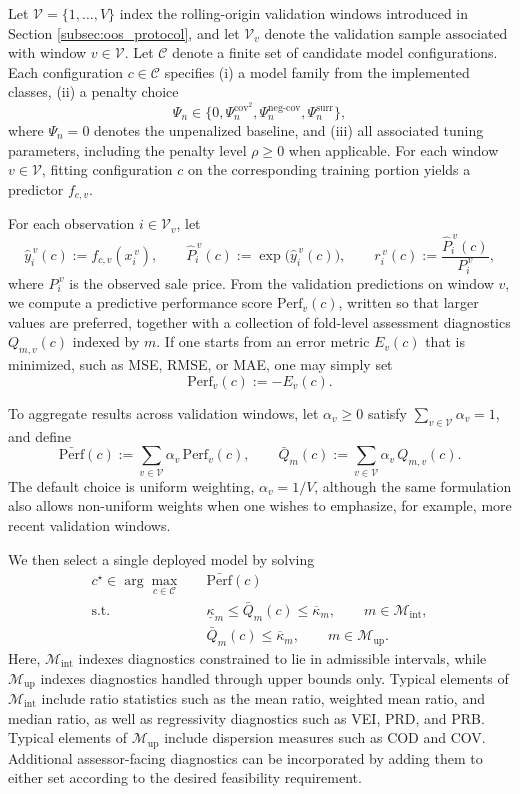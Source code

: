 \documentclass[12pt, draft]{article}
\theoremstyle{plain}
\theoremstyle{definition}
\newcommand{\1}{\mathbf{1}}
\begin{document}
{Let $\mathcal V=\{1,\dots,V\}$ index the rolling-origin validation windows introduced in Section \ref{subsec:oos_protocol}, and let $\mathcal V_v$ denote the validation sample associated with window $v\in\mathcal V$. Let $\mathcal C$ denote a finite set of candidate model configurations. Each configuration $c\in\mathcal C$ specifies
(i) a model family from the implemented classes,
(ii) a penalty choice
\[
\Psi_n \in \{0,\Psi_n^{\mathrm{cov}^2},\Psi_n^{\mathrm{neg\mbox{-}cov}},\Psi_n^{\mathrm{surr}}\},
\]
where $\Psi_n=0$ denotes the unpenalized baseline, and
(iii) all associated tuning parameters, including the penalty level $\rho\ge 0$ when applicable.
For each window $v\in\mathcal V$, fitting configuration $c$ on the corresponding training portion yields a predictor $f_{c,v}$.

For each observation $i\in\mathcal V_v$, let
\[
\hat y_i^{\,v}(c):=f_{c,v}(x_i^{\,v}),
\qquad
\hat P_i^{\,v}(c):=\exp\!\bigl(\hat y_i^{\,v}(c)\bigr),
\qquad
r_i^{\,v}(c):=\frac{\hat P_i^{\,v}(c)}{P_i^{\,v}},
\]
where $P_i^{\,v}$ is the observed sale price. From the validation predictions on window $v$, we compute a predictive performance score $\mathrm{Perf}_v(c)$, written so that larger values are preferred, together with a collection of fold-level assessment diagnostics $Q_{m,v}(c)$ indexed by $m$. If one starts from an error metric $E_v(c)$ that is minimized, such as MSE, RMSE, or MAE, one may simply set
\[
\mathrm{Perf}_v(c):=-E_v(c).
\]

To aggregate results across validation windows, let $\alpha_v\ge 0$ satisfy $\sum_{v\in\mathcal V}\alpha_v=1$, and define
\[
\bar{\mathrm{Perf}}(c):=\sum_{v\in\mathcal V}\alpha_v\,\mathrm{Perf}_v(c),
\qquad
\bar Q_m(c):=\sum_{v\in\mathcal V}\alpha_v\,Q_{m,v}(c).
\]
The default choice is uniform weighting, $\alpha_v=1/V$, although the same formulation also allows non-uniform weights when one wishes to emphasize, for example, more recent validation windows.

We then select a single deployed model by solving
\begin{align}
\label{opt:model_selection_single}
c^\star
\in
\arg\max_{c\in\mathcal C}
\quad
& \bar{\mathrm{Perf}}(c)
\\
\text{s.t.}\quad
& \underline{\kappa}_m \le \bar Q_m(c) \le \overline{\kappa}_m,
\qquad m\in\mathcal M_{\mathrm{int}},
\nonumber\\
& \bar Q_m(c) \le \overline{\kappa}_m,
\qquad m\in\mathcal M_{\mathrm{up}}.
\nonumber
\end{align}
Here, $\mathcal M_{\mathrm{int}}$ indexes diagnostics constrained to lie in admissible intervals, while $\mathcal M_{\mathrm{up}}$ indexes diagnostics handled through upper bounds only. Typical elements of $\mathcal M_{\mathrm{int}}$ include ratio statistics such as the mean ratio, weighted mean ratio, and median ratio, as well as regressivity diagnostics such as VEI, PRD, and PRB. Typical elements of $\mathcal M_{\mathrm{up}}$ include dispersion measures such as COD and COV. Additional assessor-facing diagnostics can be incorporated by adding them to either set according to the desired feasibility requirement.

}
\end{document}
